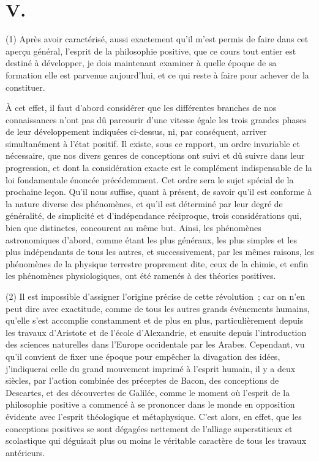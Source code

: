\documentclass[french,twoside]{book} %
\begin{document}
\section[{V.}]{V.}
\noindent (1) Après avoir caractérisé, aussi exactement qu’il m’est permis de faire dans cet aperçu général, l’esprit de la philosophie positive, que ce cours tout entier est destiné à développer, je dois maintenant examiner à quelle époque de sa formation elle est parvenue aujourd’hui, et ce qui reste à faire pour achever de la constituer.\par
À cet effet, il faut d’abord considérer que les différentes branches de nos connaissances n’ont pas dû parcourir d’une vitesse égale les trois grandes phases de leur développement indiquées ci-dessus, ni, par conséquent, arriver simultanément à l’état positif. Il existe, sous ce rapport, un ordre invariable et nécessaire, que nos divers genres de conceptions ont suivi et dû suivre dans leur progression, et dont la considération exacte est le complément indispensable de la loi fondamentale énoncée précédemment. Cet ordre sera le sujet spécial de la prochaine leçon. Qu’il nous suffise, quant à présent, de savoir qu’il est conforme à la nature diverse des phénomènes, et qu’il est déterminé par leur degré de généralité, de simplicité et d’indépendance réciproque, trois considérations qui, bien que distinctes, concourent au même but. Ainsi, les phénomènes astronomiques d’abord, comme étant les plus généraux, les plus simples et les plus indépendants de tous les autres, et successivement, par les mêmes raisons, les phénomènes de la physique terrestre proprement dite, ceux de la chimie, et enfin les phénomènes physiologiques, ont été ramenés à des théories positives.\par
(2) Il est impossible d’assigner l’origine précise de cette révolution ; car on n’en peut dire avec exactitude, comme de tous les autres grands événements humains, qu’elle s’est accomplie constamment et de plus en plus, particulièrement depuis les travaux d’Aristote et de l’école d’Alexandrie, et ensuite depuis l’introduction des sciences naturelles dans l’Europe occidentale par les Arabes. Cependant, vu qu’il convient de fixer une époque pour empêcher la divagation des idées, j’indiquerai celle du grand mouvement imprimé à l’esprit humain, il y a deux siècles, par l’action combinée des préceptes de Bacon, des conceptions de Descartes, et des découvertes de Galilée, comme le moment où l’esprit de la philosophie positive a commencé à se prononcer dans le monde en opposition évidente avec l’esprit théologique et métaphysique. C’est alors, en effet, que les conceptions positives se sont dégagées nettement de l’alliage superstitieux et scolastique qui déguisait plus ou moins le véritable caractère de tous les travaux antérieurs.\par
\end{document}
